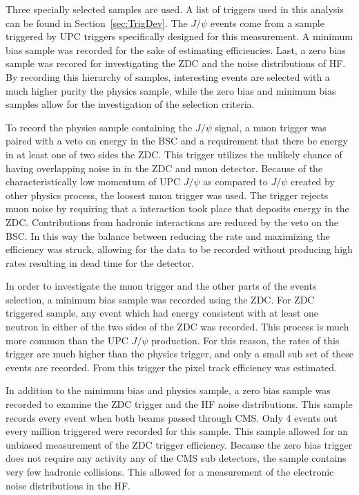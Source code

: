     Three specially selected samples are used.
    A list of triggers used in this analysis can be found in 
      Section~\ref{sec:TrigDev}.
    The $J/\psi$ events come from a sample triggered by UPC triggers 
      specifically designed for this measurement.
    A minimum bias sample was recorded for the sake of estimating efficiencies.
    Last, a zero bias sample was recored for investigating the ZDC and the 
      noise distributions of HF.
    By recording this hierarchy of samples, interesting events are selected 
      with a much higher purity the physics sample, while the zero bias and 
      minimum bias samples allow for the investigation of the selection 
      criteria. 

    To record the physics sample containing the $J/\psi$ signal, a muon trigger
      was paired with a veto on energy in the BSC and a requirement that there 
      be energy in at least one of two sides the ZDC. 
    This trigger utilizes the unlikely chance of having overlapping noise in
      in the ZDC and muon detector.
    Because of the characteristically low momentum of UPC $J/\psi$ as compared
      to $J/\psi$ created by other physics process, the loosest muon 
      trigger was used.
    The trigger rejects muon noise by requiring that a interaction took place
      that deposits energy in the ZDC.
    Contributions from hadronic interactions are reduced by the veto on the 
      BSC.
    In this way the balance between reducing the rate and maximizing the 
      efficiency was struck, allowing for the data to be recorded without 
      producing high rates resulting in dead time for the detector.  
    
    In order to investigate the muon trigger and the other parts of the events 
      selection, a minimum bias sample was recorded using the ZDC. 
    For ZDC triggered sample, any event which had energy consistent with at 
      least one neutron in either of the two sides of the ZDC was recorded.
    This process is much more common than the UPC $J/\psi$ production.
    For this reason, the rates of this trigger are much higher than the physics
      trigger, and only a small sub set of these events are recorded.
    From this trigger the pixel track efficiency was estimated. 

    In addition to the minimum bias and physics sample, a zero bias sample was 
      recorded to examine the ZDC trigger and the HF noise distributions. 
    This sample records every event when both beams passed through CMS. 
    Only 4 events out every million triggered were recorded for this sample. 
    This sample allowed for an unbiased measurement of the ZDC trigger 
      efficiency. 
    Because the zero bias trigger does not require any activity any of the
      CMS sub detectors, the sample contains very few hadronic collisions. 
    This allowed for a measurement of the electronic noise distributions in
      the HF.

